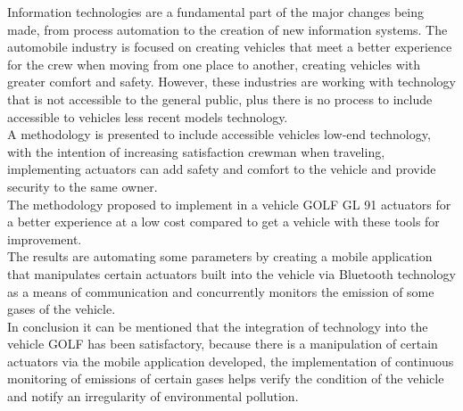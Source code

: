 Information technologies are a fundamental part of the major changes being made, from process automation to the creation of new information systems. The automobile industry is focused on creating vehicles that meet a better experience for the crew when moving from one place to another, creating vehicles with greater comfort and safety.
However, these industries are working with technology that is not accessible to the general public, plus there is no process to include accessible to vehicles less recent models technology.\\[\separacionCorta]

A methodology is presented to include accessible vehicles low-end technology, with the intention of increasing satisfaction crewman when traveling, implementing actuators can add safety and comfort to the vehicle and provide security to the same owner.\\[\separacionCorta]

The methodology proposed to implement in a vehicle GOLF GL 91  actuators for a better experience at a low cost compared to get a vehicle with these tools for improvement.\\[\separacionCorta]

The results are automating some parameters by creating a mobile application that manipulates certain actuators built into the vehicle via Bluetooth technology as a means of communication and concurrently monitors the emission of some gases of the vehicle.\\[\separacionCorta]

In conclusion it can be mentioned that the integration of technology into the vehicle GOLF has been satisfactory, because there is a manipulation of certain actuators via the mobile application developed, the implementation of continuous monitoring of emissions of certain gases helps verify the condition of the vehicle and notify an irregularity of environmental pollution.\\[\separacionCorta]


